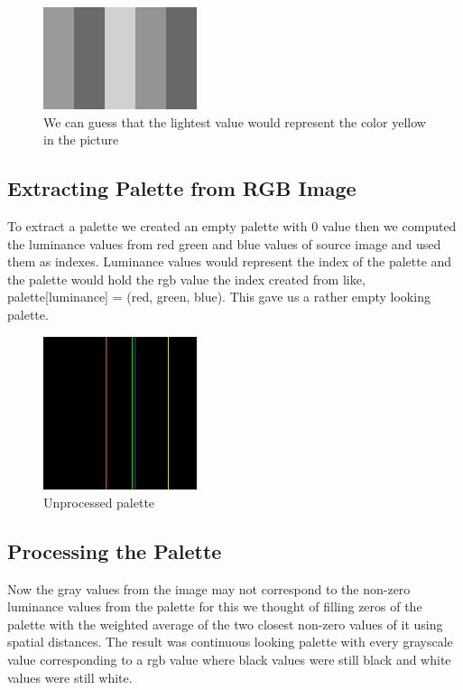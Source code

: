 \documentclass[conference]{IEEEtran}
\begin{document}
\begin{figure}[H]
    \centering
    \includegraphics[width=0.4\textwidth]{resources/4.png}
    \caption{We can guess that the lightest value would represent the color yellow in the picture}
    \label{fig:image_4_gray}
\end{figure}


\subsection{Extracting Palette from RGB Image}
To extract a palette we created an empty palette with 0 value then we computed the luminance values from red green and blue values of source image and used them as indexes. Luminance values would represent the index of the palette and the palette would hold the rgb value the index created from like, palette[luminance] = (red, green, blue). This gave us a rather empty looking palette. 

\begin{figure}[H]
    \centering
    \includegraphics[width=0.4\textwidth]{resources/4_palette.png}
    \caption{Unprocessed palette}
    \label{fig:image_4_palette}
\end{figure}

\subsection{Processing the Palette}
Now the gray values from the image may not correspond to the non-zero luminance values from the palette for this we thought of filling zeros of the palette with the weighted average of the two closest non-zero values of it using spatial distances. The result was continuous looking palette with every grayscale value corresponding to a rgb value where black values were still black and white values were still white.
\end{document}
